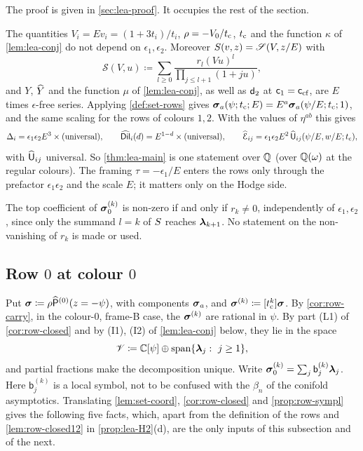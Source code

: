 The proof is given in \cref{sec:lea-proof}. It occupies the rest of the section.

\begin{rmk}[Scaling]\label{rmk:lea-scale}
The quantities $V_i=Ev_i=(1+3t_i)/t_i$, $\rho=-V_0/t_{\mathrm{c}}$, $t_{\mathrm{c}}$ and the function $\kappa$ of \cref{lem:lea-conj} do not depend on $\epsilon_1,\epsilon_2$. Moreover $S(v,z)=\mathscr{S}(V,z/E)$ with
\[
\mathscr{S}(V,u)\coloneqq\sum_{l\ge0}\frac{r_l(Vu)^l}{\prod_{j\le l+1}(1+ju)},
\]
and $Y$, $\widehat{Y}$ and the function $\mu$ of \cref{lem:lea-conj}, as well as $\mathsf{d}_{2}$ at $\mathsf{c}_{1}=\mathsf{c}_{\mathrm{cf}}$, are $E$ times $\epsilon$-free series. Applying \cref{def:set-rows} gives $\boldsymbol{\sigma}_a(\psi;t_{\mathrm{c}};E)=E^a\boldsymbol{\sigma}_a(\psi/E;t_{\mathrm{c}};1)$, and the same scaling for the rows of colours $1,2$. With the values of $\eta^{ab}$ this gives
\[
\Delta_i=\epsilon_1\epsilon_2E^3\times(\text{universal}),\qquad \widehat{\mathsf{Dil}}_i(d)=E^{1-d}\times(\text{universal}),\qquad \widehat{\mathcal{E}}_{ij}=\epsilon_1\epsilon_2E^2\,\widehat{\mathsf{U}}_{ij}(\psi/E,w/E;t_{\mathrm{c}}),
\]
with $\widehat{\mathsf{U}}_{ij}$ universal. So \cref{thm:lea-main} is one statement over $\mathbb{Q}$ (over $\mathbb{Q}(\omega)$ at the regular colours). The framing $\tau=-\epsilon_1/E$ enters the rows only through the prefactor $\epsilon_1\epsilon_2$ and the scale $E$; it matters only on the Hodge side.

The top coefficient of $\boldsymbol{\sigma}_0^{(k)}$ is non-zero if and only if $r_k\neq0$, independently of $\epsilon_1,\epsilon_2$, since only the summand $l=k$ of $S$ reaches $\boldsymbol{\lambda}_{k+1}$. No statement on the non-vanishing of $r_k$ is made or used.
\end{rmk}

\subsection{Row \texorpdfstring{$0$}{0} at colour \texorpdfstring{$0$}{0}}\label{sec:lea-row0}

Put $\boldsymbol{\sigma}\coloneqq\rho\widehat{\mathsf{P}}^{(0)}(z=-\psi)$, with components $\boldsymbol{\sigma}_a$, and $\boldsymbol{\sigma}^{(k)}\coloneqq[t_{\mathrm{c}}^k]\boldsymbol{\sigma}$. By \cref{cor:row-carry}, in the colour-$0$, frame-B case, the $\boldsymbol{\sigma}^{(k)}$ are rational in $\psi$. By part (L1) of \cref{cor:row-closed} and by (I1), (I2) of \cref{lem:lea-conj} below, they lie in the space
\[
\leaV\coloneqq\bbC[\psi]\oplus\mathrm{span}\{\lf_j:\ j\ge1\},
\]
and partial fractions make the decomposition unique. Write $\boldsymbol{\sigma}_0^{(k)}=\sum_j\mathsf{b}_j^{(k)}\boldsymbol{\lambda}_j$. Here $\mathsf{b}_j^{(k)}$ is a local symbol, not to be confused with the $\beta_n$ of the conifold asymptotics. Translating \cref{lem:set-coord}, \cref{cor:row-closed} and \cref{prop:row-sympl} gives the following five facts, which, apart from the definition of the rows and \cref{lem:row-closed12} in \cref{prop:lea-H2}(d), are the only inputs of this subsection and of the next.

